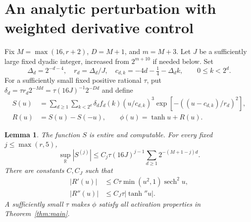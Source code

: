 \documentclass[11pt]{article}
\newtheorem{lemma}[theorem]{Lemma}
\theoremstyle{remark}\newtheorem{remark}[theorem]{Remark}
\newcommand{\R}{\mathbb R}
\begin{document}
\section{An analytic perturbation with weighted derivative control}
Fix $M=\max(16,r+2)$, $D=M+1$, and $m=M+3$. Let $J$ be a
sufficiently large fixed dyadic integer, increased from $2^{m+10}$
if needed below. Set
\[
 \Delta_d=2^{-d-4},\quad r_d=\Delta_d/J,\quad
 c_{d,k}=-4d-\tfrac14-\Delta_d k,\qquad 0\le k<2^d.
\]
For a sufficiently small fixed positive rational $\tau$, put
$\delta_d=\tau r_d2^{-Md}=\tau(16J)^{-1}2^{-Dd}$ and define
\begin{align}
 S(u)&=\sum_{d\ge1}\sum_{k<2^d}\delta_df_d(k)(u/c_{d,k})^3
                   \exp[-((u-c_{d,k})/r_d)^2],\label{eq:S}\\
 R(u)&=S(u)-S(-u),\qquad \phi(u)=\tanh u+R(u).\label{eq:phi}
\end{align}
\begin{lemma}\label{lem:phi}
The function $S$ is entire and computable. For every fixed
$j\le\max(r,5)$,
\begin{equation}\label{eq:globalder}
 \sup_{\R}|S^{(j)}|\le
 C_j\tau(16J)^{j-1}\sum_{d\ge1}2^{-(M+1-j)d}.
\end{equation}
There are constants $C,C_J$ such that
\begin{align}
 |R'(u)|&\le C\tau\min(u^2,1)\operatorname{sech}^2u,
                                      \label{eq:weightedfirst}\\
 |R''(u)|&\le C_J\tau|\tanh''u|.        \label{eq:weightedsecond}
\end{align}
A sufficiently small $\tau$ makes $\phi$ satisfy all activation
properties in Theorem~\ref{thm:main}.
\end{lemma}
\end{document}
